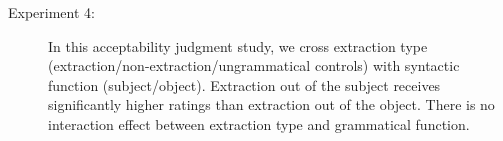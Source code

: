 \begin{description}
\item[Experiment 4:] In this acceptability judgment study, we cross extraction type (extraction\slash non-extraction\slash ungrammatical controls) with syntactic function (subject\slash object). Extraction out of the subject receives significantly higher ratings than extraction out of the object. There is no interaction effect between extraction type and grammatical function.

\end{description}
